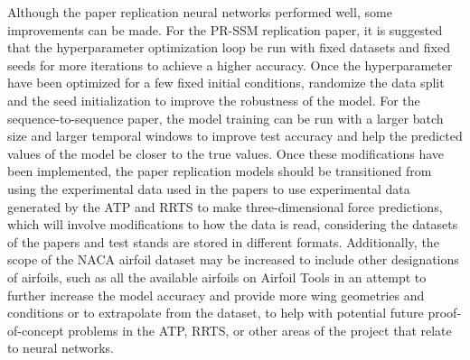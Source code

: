 Although the paper replication neural networks performed well, some improvements can be made. For the PR-SSM replication paper, it is suggested that the hyperparameter optimization loop be run with fixed datasets and fixed seeds for more iterations to achieve a higher accuracy. Once the hyperparameter have been optimized for a few fixed initial conditions, randomize the data split and the seed initialization to improve the robustness of the model. For the sequence-to-sequence paper, the model training can be run with a larger batch size and larger temporal windows to improve test accuracy and help the predicted values of the model be closer to the true values. Once these modifications have been implemented, the paper replication models should be transitioned from using the experimental data used in the papers to use experimental data generated by the ATP and RRTS to make three-dimensional force predictions, which will involve modifications to how the data is read, considering the datasets of the papers and test stands are stored in different formats. Additionally, the scope of the NACA airfoil dataset may be increased to include other designations of airfoils, such as all the available airfoils on Airfoil Tools in an attempt to further increase the model accuracy and provide more wing geometries and conditions or to extrapolate from the dataset, to help with potential future proof-of-concept problems in the ATP, RRTS, or other areas of the project that relate to neural networks.
